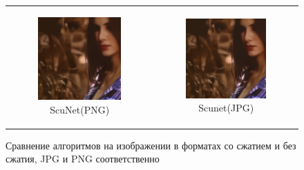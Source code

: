 \begin{figure}
\begin{tabular}{cc}
    \begin{subfigure}{0.3\textwidth}
      \includegraphics[width=\linewidth]{inc/research/formats/denoised_scunet_png.png}
      \caption{ScuNet(PNG)}
    \end{subfigure} &
    \begin{subfigure}{0.3\textwidth}
      \includegraphics[width=\linewidth]{inc/research/formats/denoised_scunet_jpg.png}
      \caption{Scunet(JPG)}
    \end{subfigure} \\
  \end{tabular}
  \caption{Сравнение алгоритмов на изображении в форматах со сжатием и без сжатия, JPG и PNG соответственно}
  \label{fig:format}
\end{figure}

